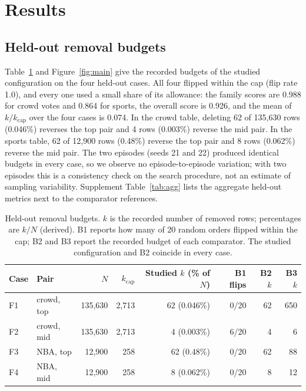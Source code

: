 \documentclass{article}
\newcommand{\kcap}{k_{\mathrm{cap}}}
\begin{document}
\section{Results}
\subsection{Held-out removal budgets}
Table~\ref{tab:cases} and Figure~\ref{fig:main} give the recorded budgets of the studied configuration on the four held-out cases. All four flipped within the cap (flip rate 1.0), and every one used a small share of its allowance: the family scores are 0.988 for crowd votes and 0.864 for sports, the overall score is 0.926, and the mean of $k/\kcap$ over the four cases is 0.074. %
In the crowd table, deleting 62 of 135,630 rows (0.046\%) reverses the top pair and 4 rows (0.003\%) reverse the mid pair. In the sports table, 62 of 12,900 rows (0.48\%) reverse the top pair and 8 rows (0.062\%) reverse the mid pair. %
The two episodes (seeds 21 and 22) produced identical budgets in every case, so we observe no episode-to-episode variation; with two episodes this is a consistency check on the search procedure, not an estimate of sampling variability. Supplement Table~\ref{tab:agg} lists the aggregate held-out metrics next to the comparator references.


\begin{table}[t]
\centering
\caption{Held-out removal budgets. $k$ is the recorded number of removed rows; percentages are $k/N$ (derived). B1 reports how many of 20 random orders flipped within the cap; B2 and B3 report the recorded budget of each comparator. The studied configuration and B2 coincide in every case.}
\label{tab:cases}
\small
\begin{tabular}{llrrrrrr}
\toprule
Case & Pair & $N$ & $\kcap$ & Studied $k$ (\% of $N$) & B1 flips & B2 $k$ & B3 $k$\\
\midrule
F1 & crowd, top & 135,630 & 2,713 & 62 (0.046\%) & 0/20 & 62 & 650\\
F2 & crowd, mid & 135,630 & 2,713 & 4 (0.003\%) & 6/20 & 4 & 6\\
F3 & NBA, top & 12,900 & 258 & 62 (0.48\%) & 0/20 & 62 & 88\\
F4 & NBA, mid & 12,900 & 258 & 8 (0.062\%) & 0/20 & 8 & 12\\
\bottomrule
\end{tabular}
\end{table}
\end{document}
